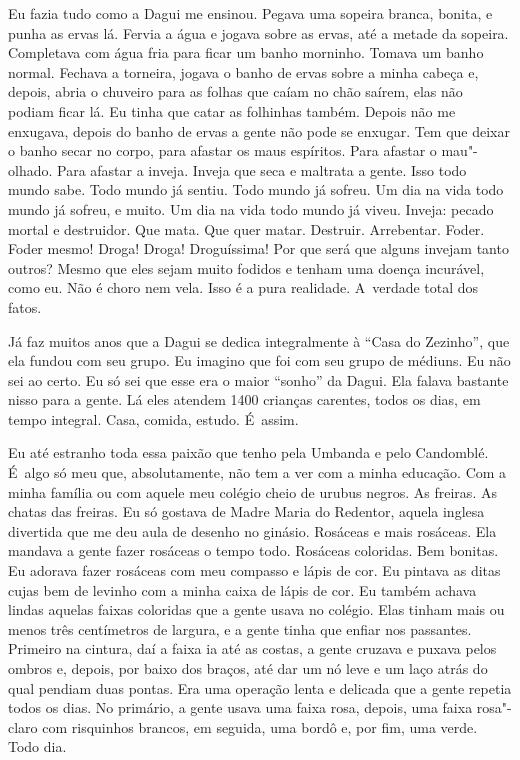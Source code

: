 Eu fazia tudo como a Dagui me ensinou. Pegava uma sopeira branca,
bonita, e punha as ervas lá. Fervia a água e jogava sobre as ervas, até
a metade da sopeira. Completava com água fria para ficar um banho
morninho. Tomava um banho normal. Fechava a torneira, jogava o banho de
ervas sobre a minha cabeça e, depois, abria o chuveiro para as folhas
que caíam no chão saírem, elas não podiam ficar lá. Eu tinha que catar
as folhinhas também. Depois não me enxugava, depois do banho de ervas a
gente não pode se enxugar. Tem que deixar o banho secar no corpo, para
afastar os maus espíritos. Para afastar o mau"-olhado. Para afastar a
inveja. Inveja que seca e maltrata a gente. Isso todo mundo sabe. Todo
mundo já sentiu. Todo mundo já sofreu. Um dia na vida todo mundo já
sofreu, e muito. Um dia na vida todo mundo já viveu. Inveja: pecado
mortal e destruidor. Que mata. Que quer matar. Destruir. Arrebentar.
Foder. Foder mesmo! Droga! Droga! Droguíssima! Por que será que alguns
invejam tanto outros? Mesmo que eles sejam muito fodidos e tenham
uma doença incurável, como eu. Não é choro nem vela. Isso é a pura
realidade. A~verdade total dos fatos.

Já faz muitos anos que a Dagui se dedica integralmente à ``Casa do
Zezinho'', que ela fundou com seu grupo. Eu imagino que foi com seu
grupo de médiuns. Eu não sei ao certo. Eu só sei que esse era o maior
``sonho'' da Dagui. Ela falava bastante nisso para a gente. Lá eles
atendem 1400 crianças carentes, todos os dias, em tempo integral. Casa,
comida, estudo. É~assim.

Eu até estranho toda essa paixão que tenho pela Umbanda e pelo
Candomblé. É~algo só meu que, absolutamente, não tem a ver com a minha
educação. Com a minha família ou com aquele meu colégio cheio de urubus
negros. As freiras. As chatas das freiras. Eu só gostava de Madre Maria
do Redentor, aquela inglesa divertida que me deu aula de desenho no
ginásio. Rosáceas e mais rosáceas. Ela mandava a gente fazer rosáceas o
tempo todo. Rosáceas coloridas. Bem bonitas. Eu adorava fazer rosáceas
com meu compasso e lápis de cor. Eu pintava as ditas cujas bem de
levinho com a minha caixa de lápis de cor. Eu também achava lindas
aquelas faixas coloridas que a gente usava no colégio. Elas tinham mais
ou menos três centímetros de largura, e a gente tinha que enfiar nos
passantes. Primeiro na cintura, daí a faixa ia até as costas, a gente
cruzava e puxava pelos ombros e, depois, por baixo dos braços, até dar
um nó leve e um laço atrás do qual pendiam duas pontas. Era uma operação
lenta e delicada que a gente repetia todos os dias. No primário, a gente
usava uma faixa rosa, depois, uma faixa rosa"-claro com risquinhos
brancos, em seguida, uma bordô e, por fim, uma verde. Todo dia.

